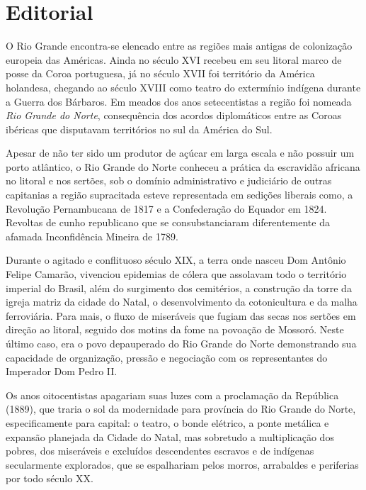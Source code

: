 \chapter{Editorial}

O Rio Grande encontra-se elencado entre as regiões mais antigas de colonização europeia das Américas. Ainda no século XVI recebeu em seu litoral marco de posse da Coroa portuguesa, já no século XVII foi território da América holandesa, chegando ao século XVIII como teatro do extermínio indígena durante a Guerra dos Bárbaros. Em meados dos anos setecentistas a região foi nomeada \textit{Rio Grande do Norte}, consequência dos acordos diplomáticos entre as Coroas ibéricas que disputavam territórios no sul da América do Sul.

Apesar de não ter sido um produtor de açúcar em larga escala e não possuir um porto atlântico, o Rio Grande do Norte conheceu a prática da escravidão africana no litoral e nos sertões, sob o domínio administrativo e judiciário de outras capitanias a região supracitada esteve representada em sedições liberais como, a Revolução Pernambucana de 1817 e a Confederação do Equador em 1824. Revoltas de cunho republicano que se consubstanciaram diferentemente da afamada Inconfidência Mineira de 1789.  

Durante o agitado e conflituoso século XIX, a terra onde nasceu Dom Antônio Felipe Camarão, vivenciou epidemias de cólera que assolavam todo o território imperial do Brasil, além do surgimento dos cemitérios, a construção da torre da igreja matriz da cidade do Natal, o desenvolvimento da cotonicultura e da malha ferroviária. Para mais, o fluxo de miseráveis que fugiam das secas nos sertões em direção ao litoral, seguido dos motins da fome na povoação de Mossoró. Neste último caso, era o povo depauperado do Rio Grande do Norte demonstrando sua capacidade de organização, pressão e negociação com os representantes do Imperador Dom Pedro II. 

Os anos oitocentistas apagariam suas luzes com a proclamação da República (1889), que traria o sol da modernidade para província do Rio Grande do Norte, especificamente para capital: o teatro, o bonde elétrico, a ponte metálica e expansão planejada da Cidade do Natal, mas sobretudo a multiplicação dos pobres, dos miseráveis e excluídos descendentes escravos e de indígenas secularmente explorados, que se espalhariam pelos morros, arrabaldes e periferias por todo século XX. 

